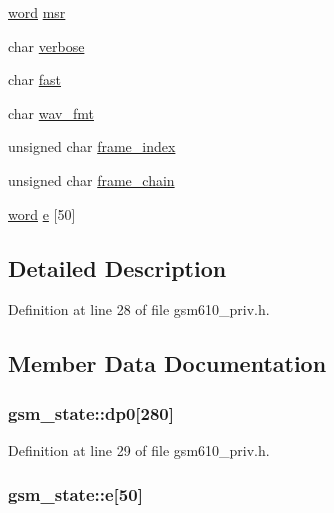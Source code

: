 \begin{DoxyCompactItemize}
\item 
\hyperlink{gsm610__priv_8h_a0b023cbb2bf7d034c2269d58d7455ac8}{word} \hyperlink{structgsm__state_aef7fbc60429ef7f577f5f95a2ddad9fa}{msr}
\item 
char \hyperlink{structgsm__state_afa9095ba58ae3a64fc7e592a2ca71ec3}{verbose}
\item 
char \hyperlink{structgsm__state_afda6b3879d77e0128b8bfb47e51aff07}{fast}
\item 
char \hyperlink{structgsm__state_ade641730743150dfb543b789e1a1b85f}{wav\+\_\+fmt}
\item 
unsigned char \hyperlink{structgsm__state_abf7921d89005fd872d12493916f514df}{frame\+\_\+index}
\item 
unsigned char \hyperlink{structgsm__state_a4cb5651ee1229f4261875a295090d437}{frame\+\_\+chain}
\item 
\hyperlink{gsm610__priv_8h_a0b023cbb2bf7d034c2269d58d7455ac8}{word} \hyperlink{structgsm__state_a4ec5ec68d8315a84762989277a319674}{e} \mbox{[}50\mbox{]}
\end{DoxyCompactItemize}


\subsection{Detailed Description}


Definition at line 28 of file gsm610\+\_\+priv.\+h.



\subsection{Member Data Documentation}
\subsubsection[{\texorpdfstring{dp0}{dp0}}]{ gsm\+\_\+state\+::dp0\mbox{[}280\mbox{]}}\hypertarget{structgsm__state_ae5b267e1ae2a30ddfdfe940f32d14949}{}\label{structgsm__state_ae5b267e1ae2a30ddfdfe940f32d14949}


Definition at line 29 of file gsm610\+\_\+priv.\+h.

\subsubsection[{\texorpdfstring{e}{e}}]{ gsm\+\_\+state\+::e\mbox{[}50\mbox{]}}\hypertarget{structgsm__state_a4ec5ec68d8315a84762989277a319674}{}\label{structgsm__state_a4ec5ec68d8315a84762989277a319674}



